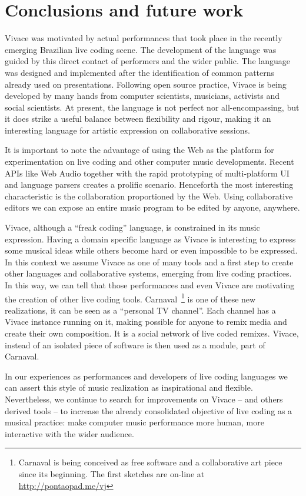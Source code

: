 \documentclass[letterpaper, 12pt]{article}
\begin{document}
{\section{Conclusions and future work}

Vivace was motivated by actual performances that took place in the
recently emerging Brazilian live coding scene. The development of the
language was guided by this direct contact of performers and the wider
public. The language was designed and implemented after the
identification of common patterns already used on
presentations. Following open source practice, Vivace is being
developed by many hands from computer scientists, musicians, activists
and social scientists. At present, the language is not perfect nor
all-encompassing, but it does strike a useful balance between
flexibility and rigour, making it an interesting language for artistic
expression on collaborative sessions.

It is important to note the advantage of using the Web as the platform
for experimentation on live coding and other computer music
developments. Recent APIs like Web Audio together with the rapid
prototyping of multi-platform UI and language parsers creates a
prolific scenario. Henceforth the most interesting characteristic is
the collaboration proportioned by the Web. Using collaborative editors
we can expose an entire music program to be edited by anyone,
anywhere.

Vivace, although a ``freak coding'' language, is constrained in its
music expression. Having a domain specific language as Vivace is
interesting to express some musical ideas while others become hard or
even impossible to be expressed. In this context we assume Vivace as
one of many tools and a first step to create other languages and
collaborative systems, emerging from live coding practices. In this
way, we can tell that those performances and even Vivace are
motivating the creation of other live coding
tools. Carnaval~\footnote{Carnaval is being conceived as free software
  and a collaborative art piece since its beginning. The first
  sketches are on-line at \url{http://pontaopad.me/vj}} is one of
these new realizations, it can be seen as a ``personal TV
channel''. Each channel has a Vivace instance running on it, making
possible for anyone to remix media and create their own
composition. It is a social network of live coded remixes. Vivace,
instead of an isolated piece of software is then used as a module,
part of Carnaval.

In our experiences as performances and developers of live coding
languages we can assert this style of music realization as
inspirational and flexible. Nevertheless, we continue to search for
improvements on Vivace -- and others derived tools -- to increase the
already consolidated objective of live coding as a musical practice:
make computer music performance more human, more interactive with the
wider audience.

}
\end{document}
